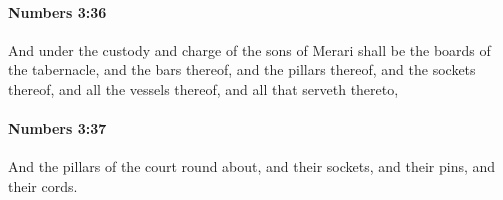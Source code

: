 		\paragraph{Numbers 3:36} %
			\label{NUMBERS-3-36}

			And under the custody and charge of the sons of Merari shall be the boards of the tabernacle, and the bars thereof, and the pillars thereof, and the sockets thereof, and all the vessels thereof, and all that serveth thereto,


		\paragraph{Numbers 3:37} %
			\label{NUMBERS-3-37}

			And the pillars of the court round about, and their sockets, and their pins, and their cords.


